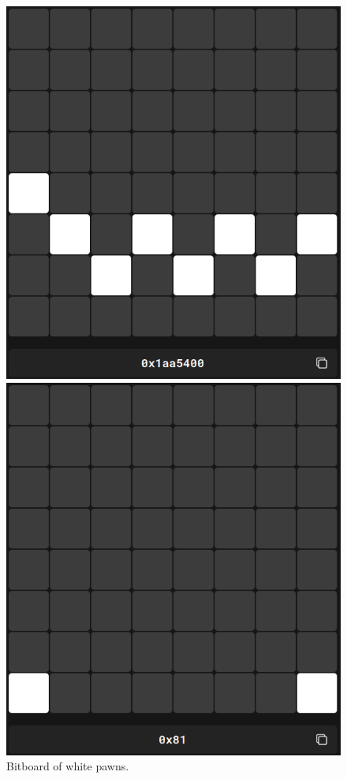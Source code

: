 \begin{figure}[t]
    \vspace{1.1em}
    \hspace*{0.03\textwidth}
    \begin{minipage}[c]{0.36\textwidth}
        \includegraphics[width=\textwidth]{Imagenes/bitboard_white_pawns.png}
        \caption*{Bitboard of white pawns.}
    \end{minipage}
    \hfill
    \begin{minipage}[c]{0.36\textwidth}
        \includegraphics[width=\textwidth]{Imagenes/bitboard_white_rooks.png}

\end{minipage}
\end{figure}
